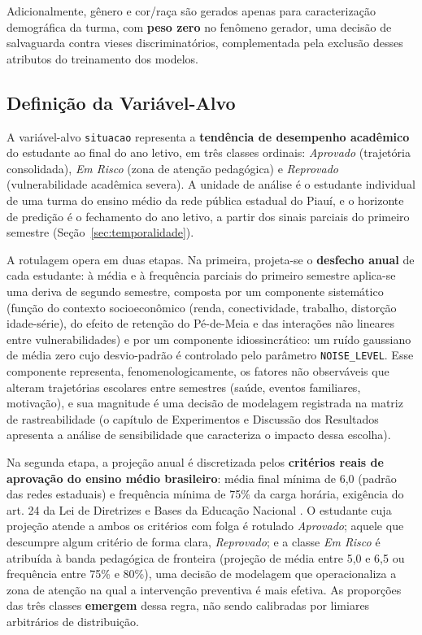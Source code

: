 Adicionalmente, gênero e cor/raça são gerados apenas para caracterização demográfica da turma, com \textbf{peso zero} no fenômeno gerador, uma decisão de salvaguarda contra vieses discriminatórios, complementada pela exclusão desses atributos do treinamento dos modelos.

\subsection{Definição da Variável-Alvo}
\label{sec:variavel_alvo}

A variável-alvo \texttt{situacao} representa a \textbf{tendência de desempenho acadêmico} do estudante ao final do ano letivo, em três classes ordinais: \textit{Aprovado} (trajetória consolidada), \textit{Em Risco} (zona de atenção pedagógica) e \textit{Reprovado} (vulnerabilidade acadêmica severa). A unidade de análise é o estudante individual de uma turma do ensino médio da rede pública estadual do Piauí, e o horizonte de predição é o fechamento do ano letivo, a partir dos sinais parciais do primeiro semestre (Seção~\ref{sec:temporalidade}).

A rotulagem opera em duas etapas. Na primeira, projeta-se o \textbf{desfecho anual} de cada estudante: à média e à frequência parciais do primeiro semestre aplica-se uma deriva de segundo semestre, composta por um componente sistemático (função do contexto socioeconômico (renda, conectividade, trabalho, distorção idade-série), do efeito de retenção do Pé-de-Meia e das interações não lineares entre vulnerabilidades) e por um componente idiossincrático: um ruído gaussiano de média zero cujo desvio-padrão é controlado pelo parâmetro \texttt{NOISE\_LEVEL}. Esse componente representa, fenomenologicamente, os fatores não observáveis que alteram trajetórias escolares entre semestres (saúde, eventos familiares, motivação), e sua magnitude é uma decisão de modelagem registrada na matriz de rastreabilidade (o capítulo de Experimentos e Discussão dos Resultados apresenta a análise de sensibilidade que caracteriza o impacto dessa escolha).

Na segunda etapa, a projeção anual é discretizada pelos \textbf{critérios reais de aprovação do ensino médio brasileiro}: média final mínima de 6,0 (padrão das redes estaduais) e frequência mínima de 75\% da carga horária, exigência do art. 24 da Lei de Diretrizes e Bases da Educação Nacional \cite{brasil1996ldb}. O estudante cuja projeção atende a ambos os critérios com folga é rotulado \textit{Aprovado}; aquele que descumpre algum critério de forma clara, \textit{Reprovado}; e a classe \textit{Em Risco} é atribuída à banda pedagógica de fronteira (projeção de média entre 5,0 e 6,5 ou frequência entre 75\% e 80\%), uma decisão de modelagem que operacionaliza a zona de atenção na qual a intervenção preventiva é mais efetiva. As proporções das três classes \textbf{emergem} dessa regra, não sendo calibradas por limiares arbitrários de distribuição.

